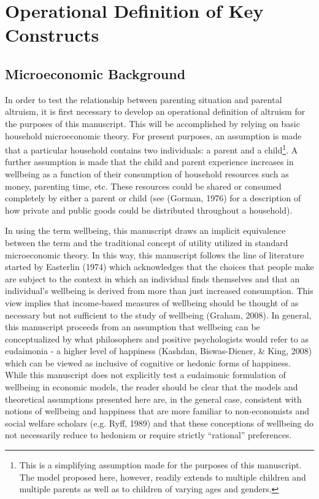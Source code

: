 \documentclass[review]{elsarticle}\usepackage[]{graphicx}\usepackage[]{color}
\begin{document}
\section{Operational Definition of Key
Constructs}\label{operational-definition-of-key-constructs}

\subsection{Microeconomic Background}\label{microeconomic-background}

In order to test the relationship between parenting situation and
parental altruism, it is first necessary to develop an operational
definition of altruism for the purposes of this manuscript. This will be
accomplished by relying on basic household microeconomic theory. For
present purposes, an assumption is made that a particular household
contains two individuals: a parent and a child\footnote{This is a
  simplifying assumption made for the purposes of this manuscript. The
  model proposed here, however, readily extends to multiple children and
  multiple parents as well as to children of varying ages and genders.}.
A further assumption is made that the child and parent experience
increases in wellbeing as a function of their consumption of household
resources such as money, parenting time, etc. These resources could be
shared or consumed completely by either a parent or child (see (Gorman,
1976) for a description of how private and public goods could be
distributed throughout a household).

In using the term wellbeing, this manuscript draws an implicit
equivalence between the term and the traditional concept of utility
utilized in standard microeconomic theory. In this way, this manuscript
follows the line of literature started by Easterlin (1974) which
acknowledges that the choices that people make are subject to the
context in which an individual finds themselves and that an individual's
wellbeing is derived from more than just increased consumption. This
view implies that income-based measures of wellbeing should be thought
of as necessary but not sufficient to the study of wellbeing (Graham,
2008). In general, this manuscript proceeds from an assumption that
wellbeing can be conceptualized by what philosophers and positive
psychologists would refer to as eudaimonia - a higher level of happiness
(Kashdan, Biswas-Diener, \& King, 2008) which can be viewed as inclusive
of cognitive or hedonic forms of happiness. While this manuscript does
not explicitly test a eudaimonic formulation of wellbeing in economic
models, the reader should be clear that the models and theoretical
assumptions presented here are, in the general case, consistent with
notions of wellbeing and happiness that are more familiar to
non-economists and social welfare scholars (e.g. Ryff, 1989) and that
these conceptions of wellbeing do not necessarily reduce to hedonism or
require strictly ``rational'' preferences.
\end{document}
